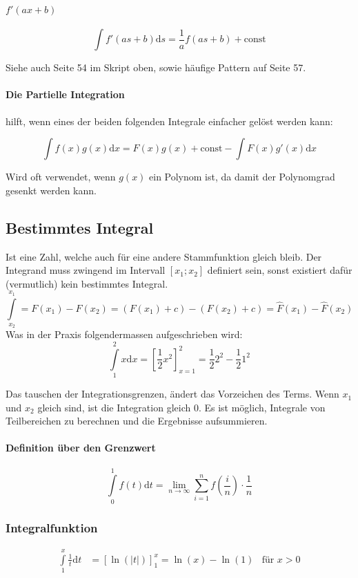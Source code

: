 \paragraph{$f'(ax+b)$}
\[
	\int f'(as + b) \mathrm{d}s = \frac{1}{a}f(as + b) + \mathrm{const}
\]

Siehe auch Seite 54 im Skript oben, sowie häufige Pattern auf Seite 57.

\paragraph{Die Partielle Integration}
hilft, wenn eines der beiden folgenden Integrale einfacher gelöst werden kann:

\[
	\int{f(x) g(x)} \mathrm{d}x = F(x) g(x) + \mathrm{const} - \int{F(x) g'(x) }\mathrm{d}x
\]

Wird oft verwendet, wenn $g(x)$ ein Polynom ist, da damit der Polynomgrad gesenkt werden kann.

\subsection{Bestimmtes Integral}

Ist eine Zahl, welche auch für eine andere Stammfunktion gleich bleib. Der Integrand muss zwingend im Intervall $[x_1; x_2]$ definiert sein, sonst existiert dafür (vermutlich) kein bestimmtes Integral.
\[
\int\limits^{x_1}_{x_2} = F(x_1) - F(x_2) = (F(x_1) + c) - (F(x_2) + c) = \hat{F}(x_1) - \hat{F}(x_2)
\]
Was in der Praxis folgendermassen aufgeschrieben wird:
\[
	\int\limits^2_1 x \mathrm{ d}x = \left[ \frac{1}{2} x^2 \right]^2_{x=1} = \frac{1}{2} 2^2 - \frac{1}{2} 1^2
\]

Das tauschen der Integrationsgrenzen, ändert das Vorzeichen des Terms. Wenn $x_1$ und $x_2$ gleich sind, ist die Integration gleich $0$. Es ist möglich, Integrale von Teilbereichen zu berechnen und die Ergebnisse aufsummieren.

\paragraph{Definition über den Grenzwert}

\[
 \int\limits^1_0{f(t)\mathrm{d}t} = \lim_{n \to \infty} \sum^n_{i=1}{f(\frac{i}{n}) \cdot \frac{1}{n}}
\]

\subsubsection{Integralfunktion}

\begin{align*}
	\int\limits^{x}_{1} \frac{1}{t} \mathrm{d}t &= \left[ \ln(|t|) \right]^x_1 = \ln(x) - \ln(1) & \text{für } x > 0
\end{align*}

